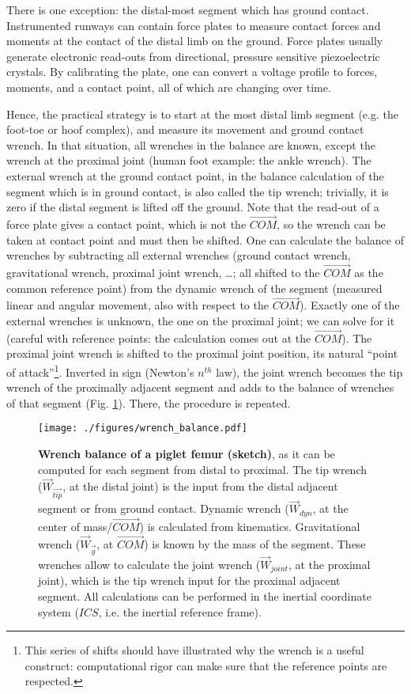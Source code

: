 There is one exception: the distal-most segment which has ground contact.
Instrumented runways can contain force plates to measure contact forces and moments at the contact of the distal limb on the ground.
Force plates usually generate electronic read-outs from directional, pressure sensitive piezoelectric crystals.
By calibrating the plate, one can convert a voltage profile to forces, moments, and a contact point, all of which are changing over time.


Hence, the practical strategy \citep{Robertson2013,Lynch2017,Dumas2004} is to start at the most distal limb segment (e.g. the foot-toe or hoof complex), and measure its movement and ground contact wrench.
In that situation, all wrenches in the balance are known, except the wrench at the proximal joint (human foot example: the ankle wrench).
The external wrench at the ground contact point, in the balance calculation of the segment which is in ground contact, is also called the tip wrench; trivially, it is zero if the distal segment is lifted off the ground.
Note that the read-out of a force plate gives a contact point, which is not the \(\vec{COM}\), so the wrench can be taken at contact point and must then be shifted.
One can calculate the balance of wrenches by subtracting all external wrenches (ground contact wrench, gravitational wrench, proximal joint wrench, \ldots{}; all shifted to the \(\vec{COM}\) as the common reference point) from the dynamic wrench of the segment (measured linear and angular movement, also with respect to the \(\vec{COM}\)).
Exactly one of the external wrenches is unknown, the one on the proximal joint; we can solve for it (careful with reference points: the calculation comes out at the \(\vec{COM}\)).
The proximal joint wrench is shifted to the proximal joint position, its natural ``point of attack''\footnote{This series of shifts should have illustrated why the wrench is a useful construct: computational rigor can make sure that the reference points are respected.}.
Inverted in sign (Newton's \(n^{th}\) law), the joint wrench becomes the tip wrench of the proximally adjacent segment and adds to the balance of wrenches of that segment (Fig. \ref{fig:wrenchbalance}).
There, the procedure is repeated.

\begin{figure}[p]
\centering
\texttt{[image: ./figures/wrench\_balance.pdf]}
\caption{\label{fig:wrenchbalance}\textbf{Wrench balance of a piglet femur (sketch)}, as it can be computed for each segment from distal to proximal. The tip wrench (\(\vec{W}_{\vec{tip}}\), at the distal joint) is the input from the distal adjacent segment or from ground contact. Dynamic wrench (\(\vec{W}_{dyn}\), at the center of mass/\(\vec{COM}\)) is calculated from kinematics. Gravitational wrench (\(\vec{W}_{\vec{g}}\), at \(\vec{COM}\)) is known by the mass of the segment. These wrenches allow to calculate the joint wrench (\(\vec{W}_{joint}\), at the proximal joint), which is the tip wrench input for the proximal adjacent segment. All calculations can be performed in the inertial coordinate system (\(ICS\), i.e. the inertial reference frame).}
\end{figure}
